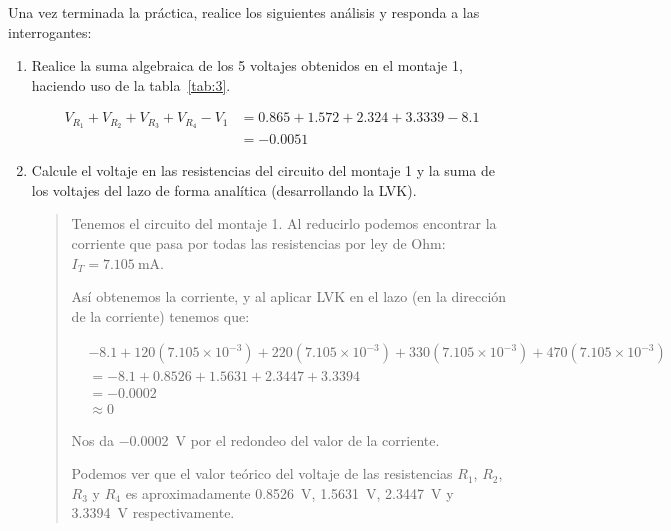 \documentclass{article}
\begin{document}
    Una vez terminada la práctica, realice los siguientes análisis y responda a las interrogantes:
    \begin{enumerate}[label=\alph*.-]
        \subsection*{Ley de voltaje de Kirchhoff}
        \item Realice la suma algebraica de los 5 voltajes obtenidos en el montaje 1, haciendo uso de la tabla~\ref{tab:3}.
        
        \begin{align*}
            V_{R_1} + V_{R_2} + V_{R_3} + V_{R_4} - V_1 &= 0.865 + 1.572 + 2.324 + 3.3339 - 8.1\\
            &= -0.0051
        \end{align*}
        
        \item Calcule el voltaje en las resistencias del circuito del montaje 1 y la suma de los voltajes del lazo de forma analítica (desarrollando la LVK).
        
        \begin{quote}
            Tenemos el circuito del montaje 1. Al reducirlo podemos encontrar la corriente que pasa por todas las resistencias por ley de Ohm: $I_T = \SI{7.105}{\milli\ampere}$.

            Así obtenemos la corriente, y al aplicar LVK en el lazo (en la dirección de la corriente) tenemos que:
            
            \begin{align*}
                &-8.1 + 120 (7.105 \times 10^{-3}) + 220 (7.105 \times 10^{-3}) + 330 (7.105 \times 10^{-3}) + 470 (7.105 \times 10^{-3})\\
                &= -8.1 + 0.8526 + 1.5631 + 2.3447 + 3.3394\\
                &= -0.0002\\
                &\approx 0
            \end{align*}

            Nos da \SI{-0.0002}{\volt} por el redondeo del valor de la corriente.

            Podemos ver que el valor teórico del voltaje de las resistencias $R_1$, $R_2$, $R_3$ y $R_4$ es aproximadamente \SI{0.8526}{\volt}, \SI{1.5631}{\volt}, \SI{2.3447}{\volt} y \SI{3.3394}{\volt} respectivamente.
        \end{quote}
        

\end{enumerate}
\end{document}
